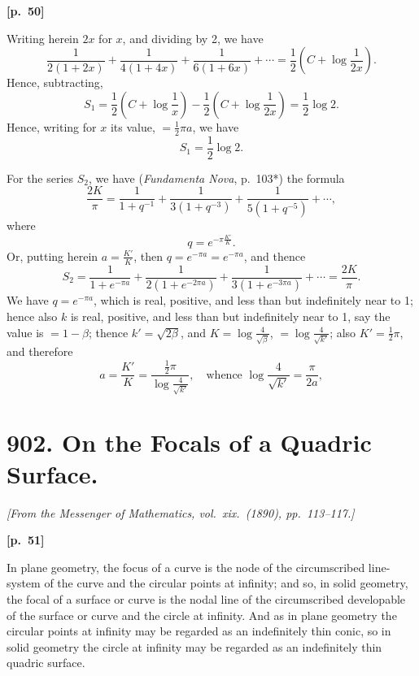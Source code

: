 \documentclass[11pt,a4paper]{article}
\theoremstyle{plain}
\begin{document}
\vspace{0.5em}
\noindent\textbf{[p.\ 50]}

Writing herein $2x$ for $x$, and dividing by 2, we have
$$
\frac{1}{2(1 + 2x)} + \frac{1}{4(1 + 4x)} + \frac{1}{6(1 + 6x)} + \cdots = \frac{1}{2}\left(C + \log\frac{1}{2x}\right).
$$
Hence, subtracting,
$$
S_1 = \frac{1}{2}\left(C + \log\frac{1}{x}\right) - \frac{1}{2}\left(C + \log\frac{1}{2x}\right) = \frac{1}{2}\log 2.
$$
Hence, writing for $x$ its value, $= \frac{1}{2}\pi a$, we have
$$
S_1 = \frac{1}{2}\log 2.
$$

For the series $S_2$, we have (\textit{Fundamenta Nova}, p.\ 103*) the formula
$$
\frac{2K}{\pi} = \frac{1}{1 + q^{-1}} + \frac{1}{3(1 + q^{-3})} + \frac{1}{5(1 + q^{-5})} + \cdots,
$$
where
$$
q = e^{-\pi\frac{K'}{K}}.
$$
Or, putting herein $a = \frac{K'}{K}$, then $q = e^{-\pi a} = e^{-\pi a}$, and thence
$$
S_2 = \frac{1}{1 + e^{-\pi a}} + \frac{1}{2(1 + e^{-2\pi a})} + \frac{1}{3(1 + e^{-3\pi a})} + \cdots = \frac{2K}{\pi}.
$$
We have $q = e^{-\pi a}$, which is real, positive, and less than but indefinitely near to 1; hence also $k$ is real, positive, and less than but indefinitely near to 1, say the value is $= 1 - \beta$; thence $k' = \sqrt{2\beta}$, and $K = \log\frac{4}{\sqrt{\beta}}$, $= \log\frac{4}{\sqrt{k'}}$; also $K' = \frac{1}{2}\pi$, and therefore
$$
a = \frac{K'}{K} = \frac{\frac{1}{2}\pi}{\log\frac{4}{\sqrt{k'}}}, \quad \text{whence } \log\frac{4}{\sqrt{k'}} = \frac{\pi}{2a},
$$

\newpage

\section*{902. On the Focals of a Quadric Surface.}

\noindent\textit{[From the Messenger of Mathematics, vol.\ xix.\ (1890), pp.\ 113--117.]}

\vspace{0.5em}
\noindent\textbf{[p.\ 51]}

In plane geometry, the focus of a curve is the node of the circumscribed line-system of the curve and the circular points at infinity; and so, in solid geometry, the focal of a surface or curve is the nodal line of the circumscribed developable of the surface or curve and the circle at infinity. And as in plane geometry the circular points at infinity may be regarded as an indefinitely thin conic, so in solid geometry the circle at infinity may be regarded as an indefinitely thin quadric surface.
\end{document}
